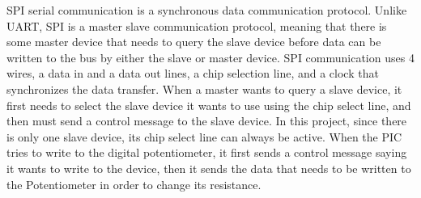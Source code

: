 \documentclass[12pt]{article}
\begin{document}
\indent SPI serial communication is a synchronous data communication protocol. Unlike UART, SPI is a master slave communication protocol, meaning that there is some master device that needs to query the slave device before data can be written to the bus by either the slave or master device. SPI communication uses 4 wires, a data in and a data out lines, a chip selection line, and a clock that synchronizes the data transfer. When a master wants to query a slave device, it first needs to select the slave device it wants to use using the chip select line, and then must send a control message to the slave device. In this project, since there is only one slave device, its chip select line can always be active. When the PIC tries to write to the digital potentiometer, it first sends a control message saying it wants to write to the device, then it sends the data that needs to be written to the Potentiometer in order to change its resistance. 
\end{document}
